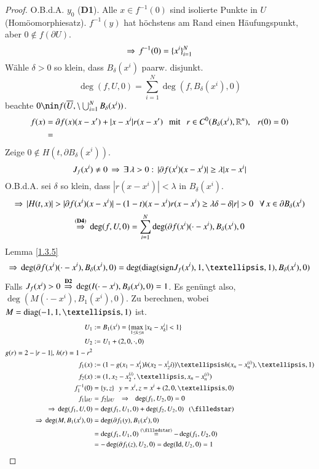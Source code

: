 \begin{proof}
    O.B.d.A. $y_0$ (\textbf{D1}). Alle $x\in f^{-1} (0)$ sind isolierte Punkte in $U$ (Homöomorphiesatz).
    $f^{-1}(y)$ hat höchstens am Rand einen Häufungspunkt, aber $0\nin f(\partial U)$.
    \[
        \Rightarrow \, f^{-1}(0)= \{ x^i \}_{i=1}^N
    \]
    Wähle $\delta >0$ so klein, dass $B_\delta(x^i)$ paarw. disjunkt.
    \[
        \deg(f,U,0)=\sum_{i=1}^N \deg(f,B_\delta(x^i),0)
    \]
    beachte $0\nin f(\ol U, \setminus \bigcup_{i=1}^N B_\delta(x^i))$.
    \begin{align*}
        f(x)&= \partial f(x)(x-x') + |x-x^i| r(x-x') \hspace{.25cm} \text{mit} \hspace{.25cm} r\in C^0(B_\delta(x^i),\mathbb{R}^n), 
        \hspace{.25cm} r(0)=0)\\
            &=
    \end{align*}
    Zeige $0\nin H(t,\partial B_\delta(x^i))$.
    \[
        J_f(x^i)\neq 0 \, \Rightarrow \, \exists\, \lambda >0:\, |\partial f(x^i)(x-x^i)|\geq \lambda|x-x^i|
    \]
    O.B.d.A. sei $\delta$ so klein, dass $|r(x-x^i)|<\lambda$ in $B_\delta (x^i)$.
    \[
        \Ra\, | H(t,x) |>|\partial f(x^i)(x-x^i)|-(1-t)(x-x^i)r(x-x^i)\geq \lambda \delta - \delta|r|>0
        \qq \forall \, x\in \partial B_\delta (x^i)
    \]
    \[
        \overset{(\textbf{D4})}{\Rightarrow} \, \deg(f,U,0)=\sum_{i=1}^N\deg (\partial f (x^i)(\cdot-x^i),
                B_\delta(x^i),0
    \]
    Lemma \ref{1.3.5}
    \[
        \Ra \, \deg(\partial f (x^i)(\cdot- x^i),B_\delta (x^i),0)= \deg(\diag(\sign J_f(x^i),1,…,1),
            B_\delta(x^i),0)
    \]
    Falls $J_f(x^i)>0\, \overset{\textbf{D2}}{\Rightarrow}\,\deg(I(\cdot-x^i),B_\delta (x^i),0)=1$. Es genüngt
    also, $\deg(M(\cdot-x^i),B_1(x^i),0)$. Zu berechnen, wobei $M=\diag(-1,1,…,1)$ ist.
    \begin{align*}
        U_1&:= B_1 (x^i) = \{ \max_{1\leq k\leq n} |x_k-x_k^i|<1 \}\\
        U_2&:= U_1+ (2,0,\cdot,0)\\
        g(r)=2-|r-1|, \, h(r)=1-r^2\\
        f_1(x)&:= (1-g(x_1-x_1^i)h(x_2-x_2^(i))…h(x_n-x_n^{(i)}),…, 1)\\
        f_2(x)&:= (1,x_2-x_2^{(i)}, … , x_n-x_n^{(i)})\\
        f_1^{-1}(0)&= \{ y,z \} \qq y=x^i, z = x^i+(2,0,…,0)\\
        f_1|_{\partial U}&= f_2|_{\partial U} \qq \Ra \qq \deg(f_1,U_2,0)=0\\
        \Ra \, \deg (f_1,U,0)&= \deg(f_1,U_1,0)+ \deg(f_2,U_2,0) \qq (\star)\\
        \Ra \, \deg(M,B_1(x^i),0)&=\deg(\partial f_1(y),B_1(x^i), 0)\\
        &=\deg(f_1, U_1,0) \overset{(\star)}{=} -\deg (f_1,U_2,0)\\
        &= -\deg(\partial f_1(z),U_2,0)=\deg(\Id, U_2,0)=1
    \end{align*}
    \[ \]
\end{proof}
